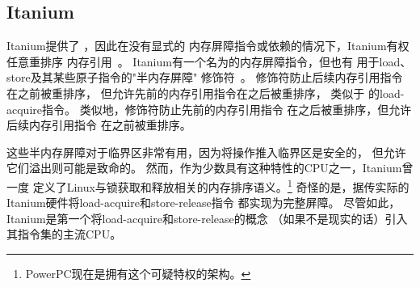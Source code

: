 \subsection{Itanium}
\label{sec:memorder:Itanium}

Itanium提供了
，因此在没有显式的
内存屏障指令或依赖的情况下，Itanium有权任意重排序
内存引用~\cite{IntelItanium02v2}。
Itanium有一个名为的内存屏障指令，但也有
用于load、store及其某些原子指令的"半内存屏障"
修饰符~\cite{IntelItanium02v3}。
修饰符防止后续内存引用指令在之前被重排序，
但允许先前的内存引用指令在之后被重排序，
类似于 的load-acquire指令。
类似地，修饰符防止先前的内存引用指令
在之后被重排序，但允许后续内存引用指令
在之前被重排序。

这些半内存屏障对于临界区非常有用，因为将操作推入临界区是安全的，
但允许它们溢出则可能是致命的。
然而，作为少数具有这种特性的CPU之一，Itanium曾一度
定义了Linux与锁获取和释放相关的内存排序语义。\footnote{
	PowerPC现在是拥有这个可疑特权的架构。}
奇怪的是，据传实际的Itanium硬件将load-acquire和store-release指令
都实现为完整屏障。
尽管如此，Itanium是第一个将load-acquire和store-release的概念
（如果不是现实的话）引入其指令集的主流CPU。

